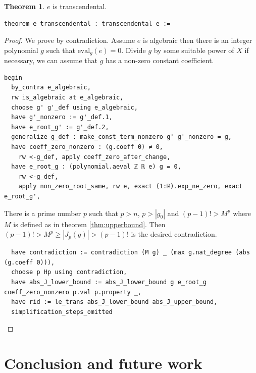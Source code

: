 \documentclass{report}
\theoremstyle{definition}
\newtheorem{theorem}{Theorem}[section]
\begin{document}
\begin{theorem}
$e$ is transcendental.

\begin{verbatim}
theorem e_transcendental : transcendental e :=
\end{verbatim}
\end{theorem}
\begin{proof}
We prove by contradiction. Assume $e$ is algebraic then there is an integer polynomial $g$ such that $\mathrm{eval}_g(e)=0$. Divide $g$ by some suitable power of $X$ if necessary, we can assume that $g$ has a non-zero constant coefficient.

\begin{verbatim}
begin
  by_contra e_algebraic,
  rw is_algebraic at e_algebraic,
  choose g' g'_def using e_algebraic,
  have g'_nonzero := g'_def.1,
  have e_root_g' := g'_def.2,
  generalize g_def : make_const_term_nonzero g' g'_nonzero = g,
  have coeff_zero_nonzero : (g.coeff 0) ≠ 0,
    rw <-g_def, apply coeff_zero_after_change,
  have e_root_g : (polynomial.aeval ℤ ℝ e) g = 0,
    rw <-g_def,
    apply non_zero_root_same, rw e, exact (1:ℝ).exp_ne_zero, exact e_root_g',
\end{verbatim}

There is a prime number $p$ such that $p>n$, $p>|g_0|$ and $(p-1)!>M^p$ where $M$ is defined as in theorem \ref{thm:upperbound}. Then $(p-1)!>M^p\ge|J_p(g)|>(p-1)!$ is the desired contradiction.
\begin{verbatim}
  have contradiction := contradiction (M g) _ (max g.nat_degree (abs (g.coeff 0))),
  choose p Hp using contradiction,
  have abs_J_lower_bound := abs_J_lower_bound g e_root_g coeff_zero_nonzero p.val p.property _,
  have rid := le_trans abs_J_lower_bound abs_J_upper_bound,
  simplification_steps_omitted
\end{verbatim}
\end{proof}

\chapter*{Conclusion and future work}
\end{document}
